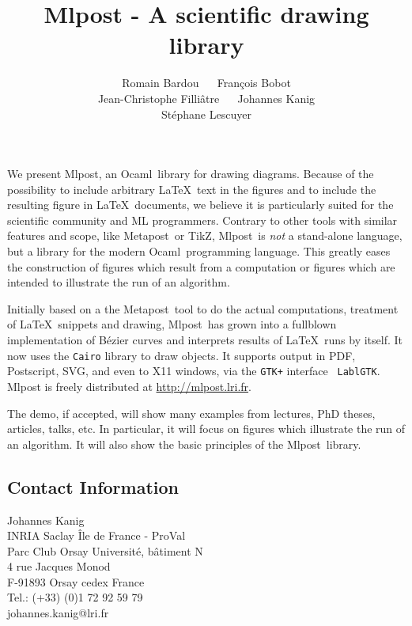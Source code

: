 \documentclass{article}
\title{Mlpost - A scientific drawing library}
\date{}
\author{Romain Bardou ~\hfill~ François Bobot \\ Jean-Christophe
  Filliâtre ~\hfill~ Johannes Kanig \\ Stéphane Lescuyer}
\newcommand{\mlpost}{Mlpost}
\newcommand{\ocaml}{Ocaml}
\newcommand{\metapost}{Metapost}
\newcommand{\tikz}{TikZ}
\begin{document}
\maketitle

We present \mlpost, an \ocaml\ library for drawing diagrams. Because
of the possibility to include arbitrary \LaTeX\ text in the figures
and to include the resulting figure in \LaTeX\ documents, we believe
it is particularly suited for the scientific community and ML
programmers. Contrary to other tools with similar features and scope,
like \metapost\ or \tikz, \mlpost\ is {\em not} a stand-alone
language, but a library for the modern \ocaml\ programming language.
This greatly eases the construction of figures which result from a
computation or figures which are intended to illustrate the run of an
algorithm.

Initially based on a the \metapost\ tool to do the actual
computations, treatment of \LaTeX\ snippets and drawing, \mlpost\ has
grown into a fullblown implementation of Bézier curves and interprets
results of \LaTeX\ runs by itself. It now uses the {\tt Cairo} library
to draw objects. It supports output in PDF, Postscript, SVG,
and even to X11 windows, via the {\tt GTK+} interface {\tt
  LablGTK}. Mlpost is freely distributed at \url{http://mlpost.lri.fr}.

The demo, if accepted, will show many examples from lectures, PhD
theses, articles, talks, etc. In particular, it will focus on figures
which illustrate the run of an algorithm. It will also show the basic
principles of the \mlpost\ library.


\subsection*{Contact Information}

Johannes Kanig\\
INRIA Saclay Île de France - ProVal\\
Parc Club Orsay Université, bâtiment N\\
4 rue Jacques Monod\\
F-91893 Orsay cedex France\\
Tel.: (+33) (0)1 72 92 59 79\\
johannes.kanig@lri.fr
\end{document}
